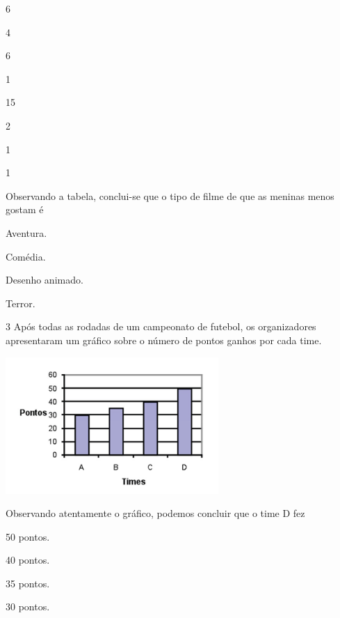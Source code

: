 
\begin{multicols}{2}
6 

4

6

1

\columnbreak

15

2

1

1
\end{multicols}

Observando a tabela, conclui-se que o tipo de filme de que as meninas menos
gostam é

\begin{minipage}{.5\textwidth}
\begin{escolha}

\item
  Aventura.
\item
  Comédia.
\item
  Desenho animado.
\item
  Terror.
\end{escolha}
\end{minipage}

\num{3} Após todas as rodadas de um campeonato de futebol, os organizadores
apresentaram um gráfico sobre o número de pontos ganhos por cada
time.

\includegraphics[width=3.19194in,height=2.04184in]{./media/image94.png}

Observando atentamente o gráfico, podemos concluir que o time D fez

\begin{minipage}{.5\textwidth}
\begin{escolha}
\item
  50 pontos.
\item
  40 pontos.
\item
  35 pontos.
\item
  30 pontos.
\end{escolha}
\end{minipage}

